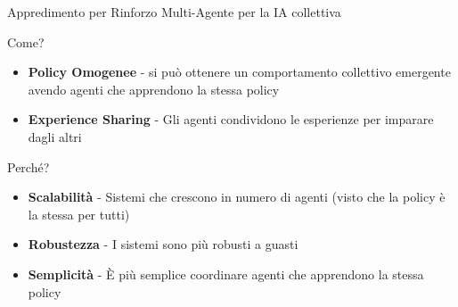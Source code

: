 \documentclass[presentation, 10pt,aspectratio=169]{beamer}\mode<presentation>{\usetheme{AMSBolognaFC}}
\begin{document}
\begin{frame}{Appredimento per Rinforzo Multi-Agente per la IA collettiva}
	\begin{exampleblock}{Come?}
		\begin{itemize}
			\item \textbf{Policy Omogenee} - si può ottenere un comportamento collettivo emergente avendo agenti che apprendono la stessa policy 
			\item \textbf{Experience Sharing} - Gli agenti condividono le esperienze per imparare dagli altri
		\end{itemize}
	\end{exampleblock}
	\begin{alertblock}{Perché?}
		\begin{itemize}
			\item \textbf{Scalabilità} - Sistemi che crescono in numero di agenti (visto che la policy è la stessa per tutti)
			\item \textbf{Robustezza} - I sistemi sono più robusti a guasti
			\item \textbf{Semplicità} - È più semplice coordinare agenti che apprendono la stessa policy
		\end{itemize}
	\end{alertblock}
\end{frame}
\end{document}
